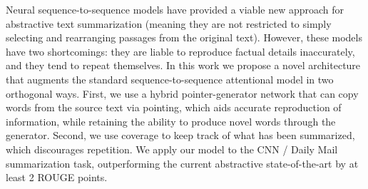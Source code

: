 Neural sequence-to-sequence models have provided a viable new approach for abstractive text summarization (meaning they are not restricted to simply selecting and rearranging passages from the original text). However, these models have two shortcomings: they are liable to reproduce factual details inaccurately, and they tend to repeat themselves. In this work we propose a novel architecture that augments the standard sequence-to-sequence attentional model in two orthogonal ways. First, we use a hybrid pointer-generator network that can copy words from the source text via pointing, which aids accurate reproduction of information, while retaining the ability to produce novel words through the generator. Second, we use coverage to keep track of what has been summarized, which discourages repetition. We apply our model to the CNN / Daily Mail summarization task, outperforming the current abstractive state-of-the-art by at least 2 ROUGE points.
